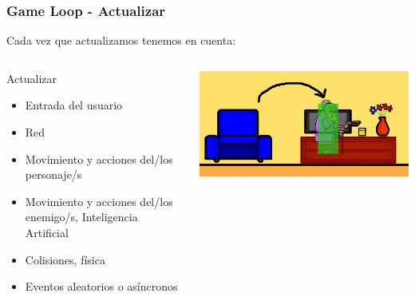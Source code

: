 \begin{frame}
	\frametitle{Game Loop - Actualizar}
	
	Cada vez que actualizamos tenemos en cuenta:
	
	\begin{columns}[c]
	\column{175pt}
		
	\begin{block}{Actualizar}
		\begin{itemize}
			\item Entrada del usuario
			\item Red
			\item Movimiento y acciones del/los personaje/s
			\item Movimiento y acciones del/los enemigo/s, Inteligencia Artificial
			\item Colisiones, física
			\item Eventos aleatorios o asíncronos
		\end{itemize}            
	\end{block}
	
	\column{125pt}
	
	\begin{center}
		\includegraphics[scale=0.25]{img/grannycolision.png}
	\end{center}	
	
	\end{columns}
	
\end{frame}

